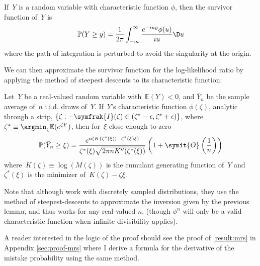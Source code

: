 \documentclass{fancyArticle}
\providecommand{\I}{\symfrak{I}}            %
\renewcommand{\|}{\,|\,}                    %
\providecommand{\;}{\,;}                    %
\renewcommand{\O}{\symit{O}\:\!}            %
\begin{document}
\begin{appendix}
  \begin{lemma*}
    If\, $Y$ is a random variable with characteristic function $\phi$, then   the survivor function of\, $Y$ is
    \begin{equation*}
      \mathbb{P}(Y\geq y)
      = \frac{1}{2\pi}\int_{-\infty}^{\infty} \frac{e^{-iuy}\phi(u)}{iu}\D u
    \end{equation*}
    where the path of integration is perturbed to avoid the singularity at   the origin.
  \end{lemma*}

  We can then approximate the survivor function for the log-likelihood ratio by applying the method of steepest descents to its characteristic function:

  \begin{lemma*}
    Let\, $Y$ be a real-valued random variable with\, $\mathbb{E}(Y)<0$, and $\bar{Y}_n$ be the sample average of\, $n$ i.i.d. draws of\, $Y$.
    If\, $Y$'s characteristic function $\phi(\zeta)$, analytic through a strip, $\{\zeta:-\I(\zeta)\in(\zeta^{*}-\epsilon,\zeta^{*}+\epsilon)\}$, where\,   $\zeta^{*}\equiv\argmin_\zeta\mathbb{E}(e^{\zeta Y})$, then for\, $\xi$ close enough to zero
    \begin{equation}
      \label{eq:saddlepoint-cdf}
      \mathbb{P}(\bar{Y}_n\geq\xi) =
      \frac{e^{n(K(\zeta^{*}(\xi)) - \zeta^{*}(\xi) \xi)}}
      {\zeta^{*}(\xi) \sqrt{2\pi n K''(\zeta^{*}(\xi))}}
      \left(1+\O\left(\frac{1}{n}\right)\right)
    \end{equation}
    where\, $K(\zeta) \equiv \log(M(\zeta))$ is the cumulant generating function of\, $Y$ and\,  $\zeta^{*}(\xi)$ is the minimizer of\, $K(\zeta)-\zeta\xi$.
  \end{lemma*}
  Note that although \citeauthor{Lugannani1980} work with discretely sampled distributions, they use the method of steepest-descents to approximate the inversion given by the previous lemma, and thus works for any real-valued $n$, (though $\phi^{n}$ will only be a valid characteristic function when infinite divisibility applies).

  A reader interested in the logic of the proof should see the proof of \autoref{result:mrs} in Appendix \ref{sec:proof-mrs} where I derive a formula for the derivative of the mistake probability using the same method.


\end{appendix}
\end{document}
